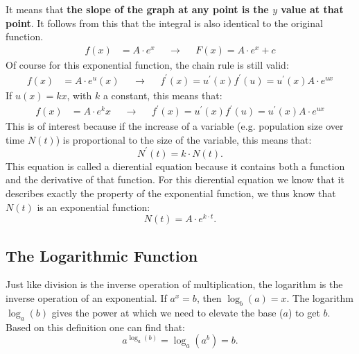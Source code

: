 \documentclass[a4paper]{report}
\begin{document}
It means that \textbf{the slope of the graph at any point is the $y$ value at that
point}. It follows from this that the integral is also identical to the original function.
\begin{align}
f(x)& = A \cdot e^x & &\rightarrow& &F(x) =  A \cdot e^x  + c
\end{align}
Of course for this exponential function, the chain rule is still valid:
\begin{align}
f(x)& = A \cdot e^u(x) & &\rightarrow& & f^\prime(x) = u^\prime(x)f^\prime(u) = u^\prime(x)A \cdot e^{ux} 
\end{align}
If $u(x)=kx$, with $k$ a constant, this means that:
\begin{align}
f(x)& = A \cdot e^kx & &\rightarrow& & f^\prime(x) = u^\prime(x)f^\prime(u) = u^\prime(x)A \cdot e^{ux} 
\end{align}
This is of interest because if the increase of a variable (e.g. population size over time $N(t)$) is proportional to the size of the variable, this means that:
\begin{equation}
N^\prime(t)=k \cdot N(t).
\end{equation}
This equation is called a dierential equation because it contains both a function and the derivative of that function. For this dierential equation we know that it describes exactly the property of the exponential function, we thus know that $N(t)$ is an exponential function:
\begin{equation}
N(t)=A \cdot e^{k \cdot t}.
\end{equation}

\subsection{The Logarithmic Function}
Just like division is the inverse operation of multiplication, the logarithm is the inverse operation of an exponential. If $a^x=b$, then $\log_b(a)=x$. The logarithm $\log_a(b)$ gives the power at which we need to elevate the base ($a$) to get $b$. Based on this definition one can find that:
\begin{equation*}
a^{\log_a(b)} = \log_a(a^b) = b.
\end{equation*}
\end{document}
